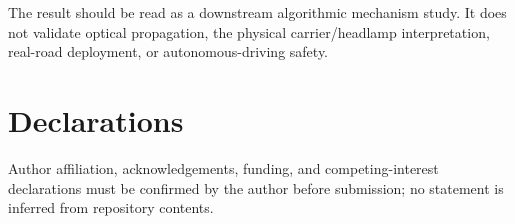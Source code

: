\documentclass[journal]{IEEEtran}
\begin{document}
The result should be read as a downstream algorithmic mechanism study. It does not validate optical propagation, the physical carrier/headlamp interpretation, real-road deployment, or autonomous-driving safety.

\section*{Declarations}
Author affiliation, acknowledgements, funding, and competing-interest declarations must be confirmed by the author before submission; no statement is inferred from repository contents.



\end{document}
